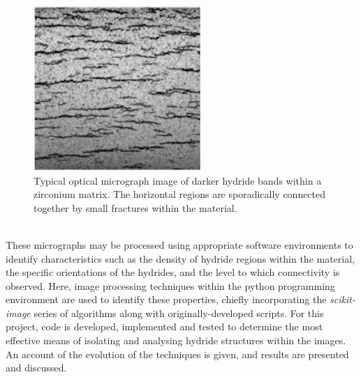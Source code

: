 \documentclass{article}
\begin{document}
	\begin{figure}[h]
		\centering
		\includegraphics[width=2.5in]{Figures/tem_hydride_eg} 
		\caption{Typical optical micrograph image of darker hydride bands within a zirconium matrix. The horizontal regions are sporadically connected together by small fractures within the material.}
		\label{fig:tem_hydride_eg}
	\end{figure}
	\\
	These micrographs may be processed using appropriate software environments to identify characteristics such as the density of hydride regions within the material, the specific orientations of the hydrides, and the level to which connectivity is observed. Here, image processing techniques within the python programming environment are used to identify these properties, chiefly incorporating the \textit{scikit-image} series of algorithms along with originally-developed scripts. For this project, code is developed, implemented and tested to determine the most effective means of isolating and analysing hydride structures within the images. An account of the evolution of the techniques is given, and results are presented and discussed.
	\\
\end{document}
